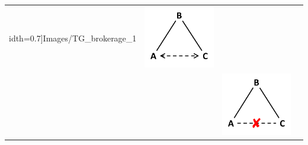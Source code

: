 {{\begin{table}[]
\begin{tabularx}{\textwidth}{p{3.5cm}p{3.5cm}p{3.5cm}p{3.5cm}}
idth=0.7\linewidth]{Images/TG_brokerage_1} \end{minipage}  & \begin{minipage}{.2\textwidth} \centering \includegraphics[width=0.7\linewidth]{Images/TI_brokerage} \end{minipage}   \\
	&  & \begin{minipage}{.2\textwidth} \centering \includegraphics[width=0.7\linewidth]{Images/TG_brokerage_2} \end{minipage}  &  \\ \midrule

\end{tabularx}
\end{table}}}
